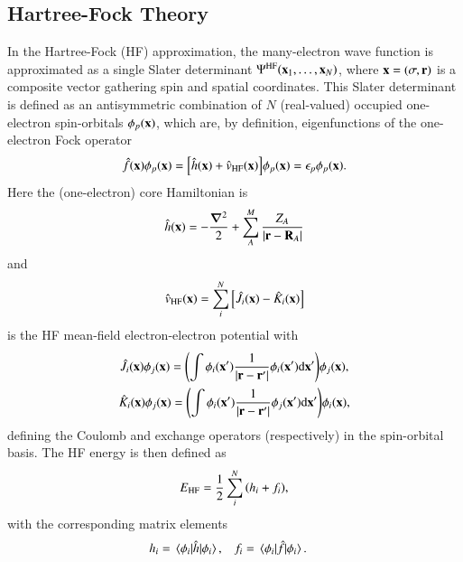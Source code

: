 \documentclass[aps,prb,reprint,noshowkeys,linenumbers,superscriptaddress]{revtex4-1}
\newcommand{\hugh}[1]{\textcolor{hughgreen}{#1}}
\newcommand{\Ne}{N} %
\begin{document}
\subsection{Hartree-Fock Theory}
\label{sec:HF}

In the Hartree-Fock (HF) approximation, the many-electron wave function is approximated as a single Slater determinant $\Psi^{\text{HF}}(\vb{x}_1,\ldots,\vb{x}_N)$, where $\vb{x} = (\sigma,\vb{r})$ is a composite vector gathering spin and spatial coordinates.
This Slater determinant is defined as an antisymmetric combination of $\Ne$ (real-valued) occupied one-electron spin-orbitals $\phi_p(\vb{x})$, which are, by definition, eigenfunctions of the one-electron Fock operator 
\begin{equation}\label{eq:FockOp}
    \Hat{f}(\vb{x}) \phi_p(\vb{x}) = \qty[ \Hat{h}(\vb{x}) + \Hat{v}_\text{HF}(\vb{x}) ] \phi_p(\vb{x}) = \epsilon_p \phi_p(\vb{x}).
\end{equation}
Here the \hugh{(one-electron)} core Hamiltonian is
\begin{equation}
\label{eq:Hcore}
	\Hat{h}(\vb{x}) = -\frac{\grad^2}{2} + \sum_{A}^{M} \frac{Z_A}{\abs{\vb{r}-\vb{R}_A}}
\end{equation}
and
\begin{equation}
    \Hat{v}_\text{HF}(\vb{x}) = \sum_i^{N} \qty[ \Hat{J}_i(\vb{x}) - \Hat{K}_i(\vb{x}) ]
\end{equation}
is the HF mean-field electron-electron potential with 
\begin{subequations}
\begin{gather}
	\label{eq:CoulOp}
    \Hat{J}_i(\vb{x})\phi_j(\vb{x})=\qty(\int \phi_i(\vb{x}')\frac{1}{\abs{\vb{r} - \vb{r}'}}\phi_i(\vb{x}') \dd\vb{x}' ) \phi_j(\vb{x}),
	\\
	\label{eq:ExcOp}
\Hat{K}_i(\vb{x})\phi_j(\vb{x})=\qty(\int \phi_i(\vb{x}')\frac{1}{\abs{\vb{r} - \vb{r}'}}\phi_j(\vb{x}') \dd\vb{x}')\phi_i(\vb{x}),
\end{gather}
\end{subequations}
defining the Coulomb and exchange operators (respectively) in the spin-orbital basis.\cite{SzaboBook}
The HF energy is then defined as 
\begin{equation}
    \label{eq:E_HF}
    E_\text{HF} = \frac{1}{2} \sum_i^{N} \qty( h_i + f_i ),
\end{equation}
with the corresponding matrix elements
\begin{align}
	h_i & = \mel{\phi_i}{\Hat{h}}{\phi_i},
    & 
    f_i & = \mel{\phi_i}{\Hat{f}}{\phi_i}.
\end{align}
\end{document}
